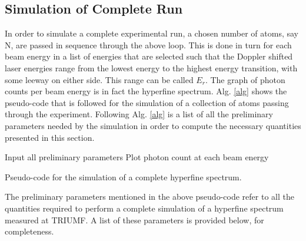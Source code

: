 \subsection{Simulation of Complete Run}
In order to simulate a complete experimental run, a chosen number of atoms, say N, are passed in sequence through the above loop. This is done in turn for each beam energy in a list of energies that are selected such that the Doppler shifted laser energies range from the lowest energy to the highest energy transition, with some leeway on either side. This range can be called $E_r$. The graph of photon counts per beam energy is in fact the hyperfine spectrum. Alg. \ref{alg} shows the pseudo-code that is followed for the simulation of a collection of atoms passing through the experiment. Following Alg. \ref{alg} is a list of all the preliminary parameters needed by the simulation in order to compute the necessary quantities presented in this section. 

\vspace{10mm}
\begin{algorithm}[H]
\SetAlgoLined
{}
 Input all preliminary parameters\;
 Plot photon count at each beam energy\;
 \caption{Pseudo-code for the simulation of a complete hyperfine spectrum.}
 \label{alg}
\end{algorithm}

\vspace{10mm}
The preliminary parameters mentioned in the above pseudo-code refer to all the quantities required to perform a complete simulation of a hyperfine spectrum measured at TRIUMF. A list of these parameters is provided below, for completeness.

